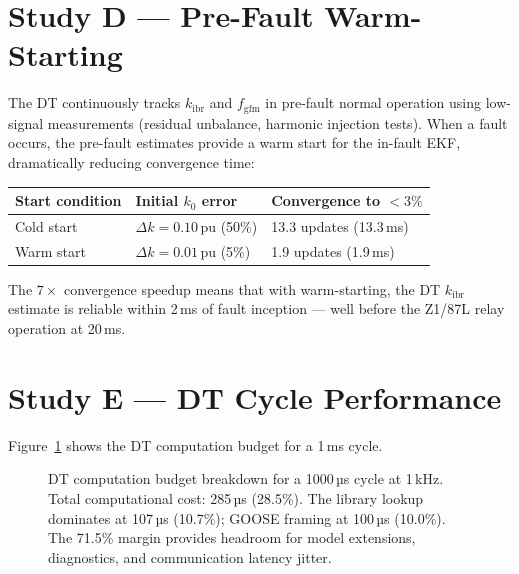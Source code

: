 \documentclass[11pt,a4paper]{article}
\begin{document}
\section{Study D --- Pre-Fault Warm-Starting}
\label{sec:studyD}

The DT continuously tracks $k_\mathrm{ibr}$ and $f_\mathrm{gfm}$ in pre-fault
normal operation using low-signal measurements (residual unbalance, harmonic
injection tests).  When a fault occurs, the pre-fault estimates provide a warm
start for the in-fault EKF, dramatically reducing convergence time:

\begin{center}
\begin{tabular}{@{}lll@{}}
\toprule
Start condition & Initial $k_0$ error & Convergence to $<3\%$ \\
\midrule
Cold start & $\Delta k = 0.10$\,pu (50\%) & 13.3 updates (13.3\,ms) \\
Warm start & $\Delta k = 0.01$\,pu (5\%) & 1.9 updates (1.9\,ms) \\
\bottomrule
\end{tabular}
\end{center}

\medskip\noindent
The $7\times$ convergence speedup means that with warm-starting, the DT
$k_\mathrm{ibr}$ estimate is reliable within 2\,ms of fault inception ---
well before the Z1/87L relay operation at 20\,ms.

\section{Study E --- DT Cycle Performance}
\label{sec:studyE}

Figure~\ref{fig:budget} shows the DT computation budget for a 1\,ms cycle.

\begin{figure}[htbp]
  \centering
  \resizebox{0.90\textwidth}{!}{}
  \caption{DT computation budget breakdown for a 1000\,µs cycle at 1\,kHz.
           Total computational cost: 285\,µs (28.5\%).  The library lookup
           dominates at 107\,µs (10.7\%); GOOSE framing at 100\,µs (10.0\%).
           The 71.5\% margin provides headroom for model extensions,
           diagnostics, and communication latency jitter.}
  \label{fig:budget}
\end{figure}
\end{document}
